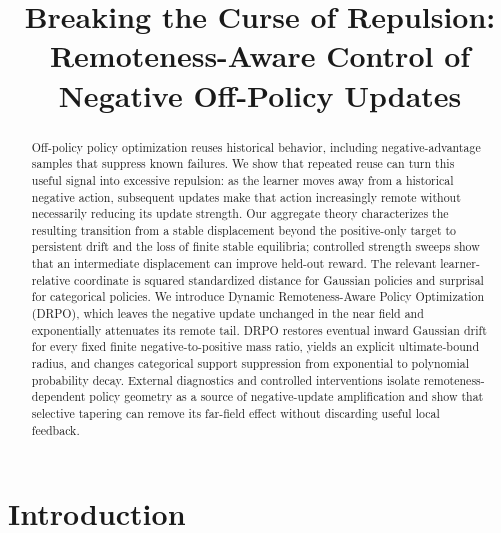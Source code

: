 \documentclass[sigconf,anonymous,review]{acmart}
\theoremstyle{acmdefinition}
\begin{document}
\title[Remoteness-Aware Control of Negative Off-Policy Updates]{Breaking the Curse of Repulsion: Remoteness-Aware Control of Negative Off-Policy Updates}


\begin{abstract}
Off-policy policy optimization reuses historical behavior, including
negative-advantage samples that suppress known failures. We show that repeated
reuse can turn this useful signal into excessive repulsion: as the learner
moves away from a historical negative action, subsequent updates make that
action increasingly remote without necessarily reducing its update strength.
Our aggregate theory characterizes the resulting transition from a stable
displacement beyond the positive-only target to persistent drift and the loss
of finite stable equilibria; controlled strength sweeps show that an
intermediate displacement can improve held-out reward. The relevant
learner-relative coordinate is squared standardized distance for Gaussian
policies and surprisal for categorical policies. We introduce Dynamic
Remoteness-Aware Policy Optimization (DRPO), which leaves the negative update
unchanged in the near field and exponentially attenuates its remote tail.
DRPO restores eventual inward Gaussian drift for every fixed finite
negative-to-positive mass ratio, yields an explicit ultimate-bound radius, and
changes categorical support suppression from exponential to polynomial
probability decay. External diagnostics and controlled interventions isolate
remoteness-dependent policy geometry as a source of negative-update
amplification and show that selective tapering can remove its far-field effect
without discarding useful local feedback.
\end{abstract}



\maketitle

\section{Introduction}
\label{sec:introduction}
\end{document}
